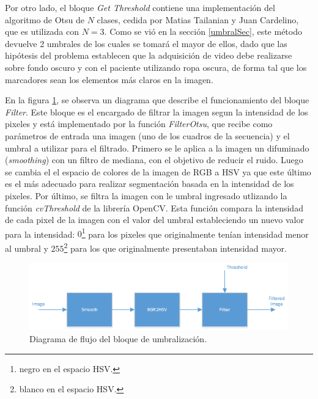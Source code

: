 Por otro lado, el bloque \emph{Get Threshold} contiene una implementación del algoritmo de Otsu\cite{otsu} de $N$ clases\cite{implementacionOtsu}, cedida por Matias Tailanian y Juan Cardelino, que es utilizada con $N=3$.
 Como se vió en la sección \ref{umbralSec}, este método devuelve 2 umbrales de los cuales se tomará el mayor de ellos, dado que las hipótesis del problema establecen que la adquisición de video debe realizarse sobre fondo oscuro y con el paciente utilizando ropa oscura, de forma tal que los marcadores sean los elementos más claros en la imagen.


En la figura \ref{diagramaumbralizacion}, se observa un diagrama que describe el funcionamiento del bloque \emph{Filter}. Este bloque es el encargado de filtrar la imagen segun la intensidad de los pixeles y está implementado por la función \emph{FilterOtsu}, que recibe como parámetros de entrada una imagen (uno de los cuadros de la secuencia) y el umbral a utilizar para el filtrado. Primero se le aplica a la imagen un difuminado (\textit{smoothing}) con un filtro de mediana, con el objetivo de reducir el ruido. Luego se cambia el el espacio de colores de la imagen de RGB a HSV ya que este último es el más adecuado para realizar segmentación basada en la intensidad de los pixeles\cite{HSV}. Por último, se filtra la imagen con le umbral ingresado utlizando la función \emph{cvThreshold} de la librería OpenCV\cite{opencv}. Esta función compara la intensidad de cada pixel de la imagen con el valor del umbral estableciendo un nuevo valor para la intensidad: $0$\footnote{negro en el espacio HSV.} para los pixeles que originalmente tenían intensidad menor al umbral y $255$\footnote{blanco en el espacio HSV.} para los que originalmente presentaban intensidad mayor.

\begin{figure}[H]
\begin{center}
\includegraphics[scale=0.7]{img/diagrama_umbralizacion.png}
\end{center}
\caption{Diagrama de flujo del bloque de umbralización.}
\label{diagramaumbralizacion}
\end{figure}

